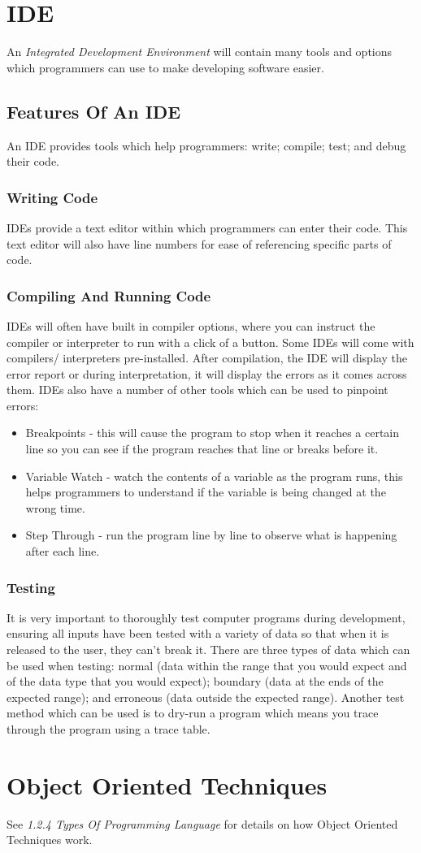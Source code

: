 \documentclass[a4paper,11pt, twocolumn]{article}
\begin{document}
\section{IDE}
An \textit{Integrated Development Environment} will contain many tools and options which programmers can use to make developing software easier. 
\subsection{Features Of An IDE}
An IDE provides tools which help programmers: write; compile; test; and debug their code. 
\subsubsection{Writing Code}
IDEs provide a text editor within which programmers can enter their code. This text editor will also have line numbers for ease of referencing specific parts of code. 
\subsubsection{Compiling And Running Code}
IDEs will often have built in compiler options, where you can instruct the compiler or interpreter to run with a click of a button. Some IDEs will come with compilers/ interpreters pre-installed. After compilation, the IDE will display the error report or during interpretation, it will display the errors as it comes across them. IDEs also have a number of other tools which can be used to pinpoint errors:
\begin{itemize}
    \item Breakpoints - this will cause the program to stop when it reaches a certain line so you can see if the program reaches that line or breaks before it.
    \item Variable Watch - watch the contents of a variable as the program runs, this helps programmers to understand if the variable is being changed at the wrong time.
    \item Step Through - run the program line by line to observe what is happening after each line. 
\end{itemize}
\subsubsection{Testing}
It is very important to thoroughly test computer programs during development, ensuring all inputs have been tested with a variety of data so that when it is released to the user, they can't break it. There are three types of data which can be used when testing: normal (data within the range that you would expect and of the data type that you would expect); boundary (data at the ends of the expected range); and erroneous (data outside the expected range). Another test method which can be used is to dry-run a program which means you trace through the program using a trace table.

\section{Object Oriented Techniques}
See \textit{1.2.4 Types Of Programming Language} for details on how Object Oriented Techniques work.
\end{document}
